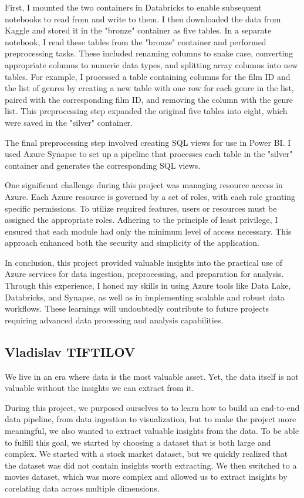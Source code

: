 \documentclass[a4paper,12pt]{article}
\begin{document}
First, I mounted the two containers in Databricks to enable subsequent notebooks to read from and write to them. I then downloaded the data from Kaggle and stored it in the "bronze" container as five tables. 
In a separate notebook, I read these tables from the "bronze" container and performed preprocessing tasks. 
These included renaming columns to snake case, converting appropriate columns to numeric data types, and splitting array columns into new tables. 
For example, I processed a table containing columns for the film ID and the list of genres by creating a new table with one row for each genre in the list, paired with the corresponding film ID, and removing the column with the genre list. 
This preprocessing step expanded the original five tables into eight, which were saved in the "silver" container.

The final preprocessing step involved creating SQL views for use in Power BI. 
I used Azure Synapse to set up a pipeline that processes each table in the "silver" container and generates the corresponding SQL views.

One significant challenge during this project was managing resource access in Azure. 
Each Azure resource is governed by a set of roles, with each role granting specific permissions. 
To utilize required features, users or resources must be assigned the appropriate roles. 
Adhering to the principle of least privilege, I ensured that each module had only the minimum level of access necessary. 
This approach enhanced both the security and simplicity of the application.

In conclusion, this project provided valuable insights into the practical use of Azure services for data ingestion, preprocessing, and preparation for analysis. 
Through this experience, I honed my skills in using Azure tools like Data Lake, Databricks, and Synapse, as well as in implementing scalable and robust data workflows. 
These learnings will undoubtedly contribute to future projects requiring advanced data processing and analysis capabilities.


\subsection{Vladislav TIFTILOV}

We live in an era where data is the most valuable asset. Yet, the data itself is not valuable without the insights we can extract from it.

During this project, we purposed ourselves to to learn how to build an end-to-end data pipeline, from data ingestion to visualization, but
to make the project more meaningful, we also wanted to extract valuable insights from the data. To be able to fulfill this goal, we started
by choosing a dataset that is both large and complex. We started with a stock market dataset, but we quickly realized that the dataset was
did not contain insights worth extracting. We then switched to a movies dataset, which was more complex and allowed us to extract insights
by corelating data across multiple dimensions.
\end{document}
